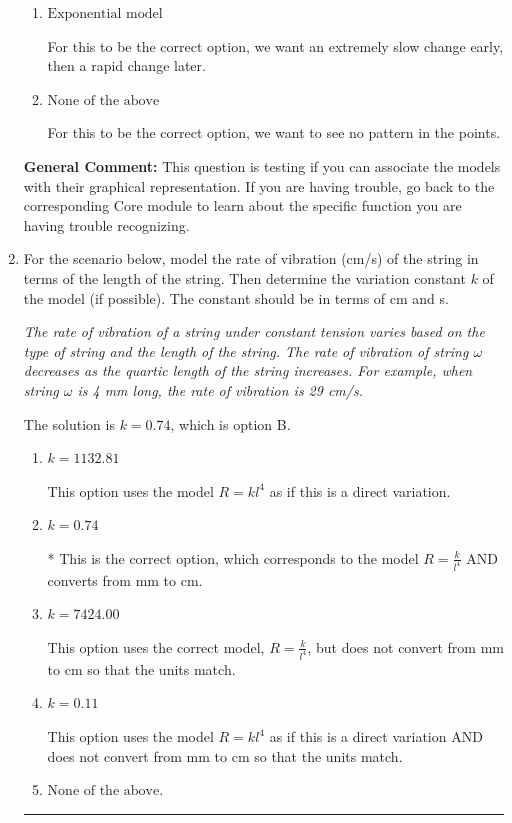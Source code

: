 \documentclass{extbook}[14pt]
\newcommand{\litem}[1]{\item #1

\rule{\textwidth}{0.4pt}}
\begin{document}
\begin{enumerate}
{\begin{enumerate}[label=\Alph*.]
For this to be the correct option, we want a rapid change early, then an extremely slow change later.
\item \( \text{Exponential model} \)

For this to be the correct option, we want an extremely slow change early, then a rapid change later.
\item \( \text{None of the above} \)

For this to be the correct option, we want to see no pattern in the points.
\end{enumerate}

\textbf{General Comment:} This question is testing if you can associate the models with their graphical representation. If you are having trouble, go back to the corresponding Core module to learn about the specific function you are having trouble recognizing.
}
\litem{
For the scenario below, model the rate of vibration (cm/s) of the string in terms of the length of the string. Then determine the variation constant $k$ of the model (if possible). The constant should be in terms of cm and s.

\begin{center}
    \textit{ The rate of vibration of a string under constant tension varies based on the type of string and the length of the string. The rate of vibration of string $\omega$ decreases as the quartic length of the string increases. For example, when string $\omega$ is 4 mm long, the rate of vibration is 29 cm/s. }
\end{center}
The solution is \( k = 0.74 \), which is option B.\begin{enumerate}[label=\Alph*.]
\item \( k = 1132.81 \)

This option uses the model $R = kl^{4}$ as if this is a direct variation.
\item \( k = 0.74 \)

* This is the correct option, which corresponds to the model $R = \frac{k}{l^{4}}$ AND converts from mm to cm.
\item \( k = 7424.00 \)

This option uses the correct model, $R = \frac{k}{l^{4}}$, but does not convert from mm to cm so that the units match.
\item \( k = 0.11 \)

This option uses the model $R = kl^{4}$ as if this is a direct variation AND does not convert from mm to cm so that the units match.
\item \( \text{None of the above.} \)


\end{enumerate}}
\end{enumerate}
\end{document}
